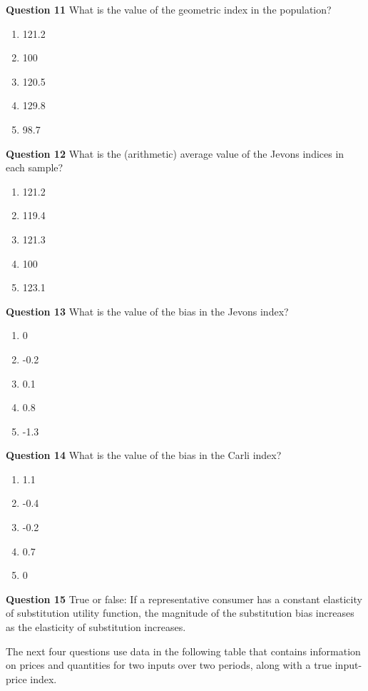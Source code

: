 \documentclass[]{article}
\begin{document}
\textbf{Question 11} What is the value of the geometric index in the population?

\begin{enumerate}
\def\labelenumi{\alph{enumi})}
\item
  121.2
\item
  100
\item
  120.5
\item
  129.8
\item
  98.7
\end{enumerate}

\textbf{Question 12} What is the (arithmetic) average value of the Jevons indices in each sample?

\begin{enumerate}
\def\labelenumi{\alph{enumi})}
\item
  121.2
\item
  119.4
\item
  121.3
\item
  100
\item
  123.1
\end{enumerate}

\textbf{Question 13} What is the value of the bias in the Jevons index?

\begin{enumerate}
\def\labelenumi{\alph{enumi})}
\item
  0
\item
  -0.2
\item
  0.1
\item
  0.8
\item
  -1.3
\end{enumerate}

\textbf{Question 14} What is the value of the bias in the Carli index?

\begin{enumerate}
\def\labelenumi{\alph{enumi})}
\item
  1.1
\item
  -0.4
\item
  -0.2
\item
  0.7
\item
  0
\end{enumerate}

\textbf{Question 15} True or false: If a representative consumer has a constant elasticity of substitution utility function, the magnitude of the substitution bias increases as the elasticity of substitution increases.

The next four questions use data in the following table that contains information on prices and quantities for two inputs over two periods, along with a true input-price index.
\end{document}
